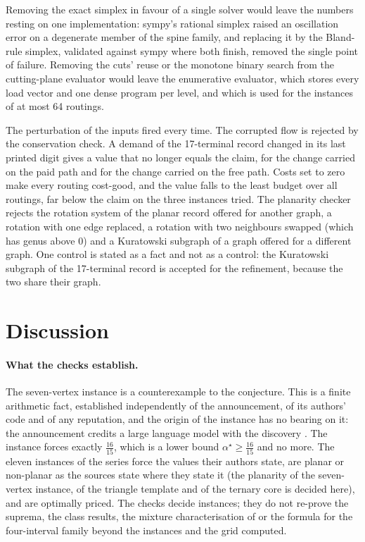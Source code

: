 \documentclass[11pt]{article}
\theoremstyle{remark}
\begin{document}
Removing the exact simplex in favour of a single solver would leave the numbers resting on one implementation: sympy's rational simplex raised an oscillation error on a degenerate member of the spine family, and replacing it by the Bland-rule simplex, validated against sympy where both finish, removed the single point of failure. Removing the cuts' reuse or the monotone binary search from the cutting-plane evaluator would leave the enumerative evaluator,
which stores every load vector and one dense program per level, and which is used for the instances of at most 64 routings.

The perturbation of the inputs fired every time. The corrupted flow is rejected by the conservation check. A demand of the 17-terminal record changed in its last printed digit gives a value that no longer equals the claim, for the change carried on the paid path and for the change carried on the free path. Costs set to zero make every routing cost-good, and the value falls to the least budget over all routings, far below the claim on the three instances tried.
The planarity checker rejects the rotation system of the planar record offered for another graph, a rotation with one edge replaced, a rotation with two neighbours swapped (which has genus above $0$) and a Kuratowski subgraph of a graph offered for a different graph. One control is stated as a fact and not as a control: the Kuratowski subgraph of the 17-terminal record is accepted for the refinement, because the two share their graph.

\section{Discussion}
\label{sec:discussion}

\paragraph{What the checks establish.} The seven-vertex instance is a counterexample to the conjecture. This is a finite arithmetic fact, established independently of the announcement, of its authors' code and of any reputation, and the origin of the instance has no bearing on it: the announcement credits a large language model with the discovery \cite{Ryb26}. The instance forces exactly $\tfrac{16}{15}$, which is a lower bound $\alpha^\star\ge\tfrac{16}{15}$ and no more.
The eleven instances of the series force the values their authors state, are planar or non-planar as the sources state where they state it (the planarity of the seven-vertex instance, of the triangle template and of the ternary core is decided here), and are optimally priced. The checks decide instances; they do not re-prove the suprema, the class results, the mixture characterisation of \cite{Nik3} or the formula for the four-interval family beyond the instances and the grid computed.
\end{document}
